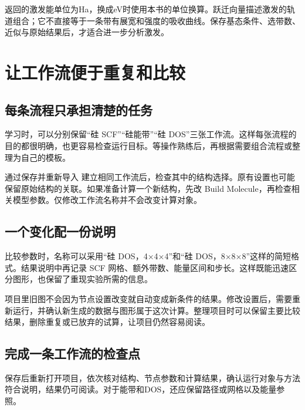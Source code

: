返回的激发能单位为Ha，换成eV时使用本书的单位换算。跃迁向量描述激发的轨道组合；它不直接等于一条带有展宽和强度的吸收曲线。保存基态条件、选带数、近似与原始结果后，才适合进一步分析激发。


\section{让工作流便于重复和比较}

\subsection{每条流程只承担清楚的任务}

学习时，可以分别保留“硅 SCF”“硅能带”“硅 DOS”三张工作流。这样每张流程的目的都很明确，也更容易检查运行目标。等操作熟练后，再根据需要组合流程或整理为自己的模板。

通过保存并重新导入  建立相同工作流后，检查其中的结构选择。原有设置也可能保留原始结构的关联。如果准备计算一个新结构，先改 Build Molecule，再检查相关模型参数。仅修改工作流名称并不会改变计算对象。

\subsection{一个变化配一份说明}

比较参数时，名称可以采用“硅 DOS，4×4×4”和“硅 DOS，8×8×8”这样的简短格式。结果说明中再记录 SCF 网格、额外带数、能量区间和步长。这样既能迅速区分图形，也保留了重现实验所需的信息。

项目里旧图不会因为节点设置改变就自动变成新条件的结果。修改设置后，需要重新运行，并确认新生成的数据与图形属于这次计算。整理项目时可以保留主要比较结果，删除重复或已放弃的试算，让项目仍然容易阅读。

\subsection{完成一条工作流的检查点}

保存后重新打开项目，依次核对结构、节点参数和计算结果，确认运行对象与方法符合说明，结果仍可阅读。对于能带和DOS，还应保留路径或网格以及能量参照。
